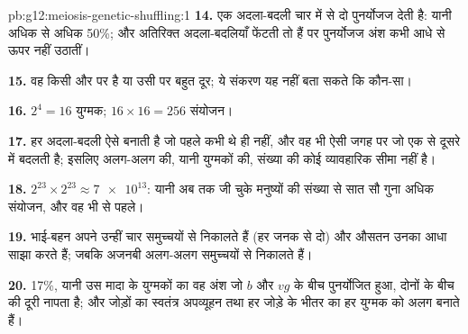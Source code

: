 \begin{solution}{pb:g12:meiosis-genetic-shuffling:1}
\textbf{14.} एक अदला-बदली चार में से दो  पुनर्योजज देती है: यानी
अधिक से अधिक 50\%; और अतिरिक्त अदला-बदलियाँ फेंटती तो हैं पर पुनर्योजज अंश
कभी आधे से ऊपर नहीं उठातीं।

\textbf{15.} वह किसी और  पर है या उसी पर बहुत दूर; ये संकरण यह नहीं
बता सकते कि कौन-सा।

\textbf{16.} $2^4 = 16$ युग्मक; $16 \times 16 = 256$ संयोजन।

\textbf{17.} हर अदला-बदली ऐसे  बनाती है जो पहले कभी थे ही नहीं, और
वह भी ऐसी जगह पर जो एक  से दूसरे में बदलती है; इसलिए
अलग-अलग  की, यानी युग्मकों की, संख्या की कोई व्यावहारिक सीमा नहीं
है।

\textbf{18.} $2^{23} \times 2^{23} \approx \num{7e13}$: यानी अब तक जी चुके
मनुष्यों की संख्या से सात सौ गुना अधिक संयोजन, और वह भी  से पहले।

\textbf{19.} भाई-बहन अपने  उन्हीं चार समुच्चयों से निकालते हैं
(हर जनक से दो) और औसतन उनका आधा साझा करते हैं; जबकि अजनबी अलग-अलग समुच्चयों
से निकालते हैं।

\textbf{20.} 17\%, यानी उस मादा के युग्मकों का वह अंश जो $b$ और $vg$ के बीच
पुनर्योजित हुआ, दोनों  के बीच की दूरी नापता है; और जोड़ों का स्वतंत्र
अपव्यूहन तथा हर जोड़े के भीतर का  हर युग्मक को अलग बनाते हैं।
\end{solution}
